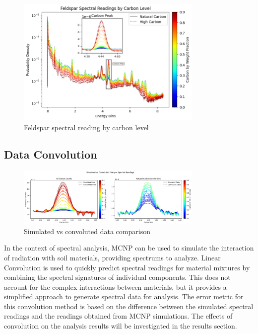 \documentclass[review]{elsarticle}
\begin{document}
\begin{figure}[H]
\centering
\includegraphics[width=0.8\textwidth]{Figures/DataGeneration/FeldsparSpectralReadingByCarbonLevel.png}
\caption{Feldspar spectral reading by carbon level}
\label{fig:feldspar_carbon}
\end{figure}

\subsection{Data Convolution}

\begin{figure}[H]
\centering
\includegraphics[width=0.8\textwidth]{Figures/DataGeneration/Sim_vs_Convoluted_FeldsparSpectralReadings_Combined.png}
\caption{Simulated vs convoluted data comparison}
\label{fig:sim_vs_conv}
\end{figure}

In the context of spectral analysis, MCNP can be used to simulate the interaction of radiation with soil materials, providing spectrums to analyze. Linear Convolution is used to quickly predict spectral readings for material mixtures by combining the spectral signatures of individual components. This does not account for the complex interactions between materials, but it provides a simplified approach to generate spectral data for analysis. The error metric for this convolution method is based on the difference between the simulated spectral readings and the readings obtained from MCNP simulations. The effects of convolution on the analysis results will be investigated in the results section.
\end{document}
